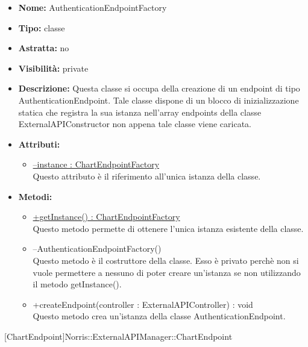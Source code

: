 			
			\begin{itemize}
			\item \textbf{Nome:} AuthenticationEndpointFactory
			\item \textbf{Tipo:} classe
			
		\item \textbf{Astratta:}
		no
			\item \textbf{Visibilità:} private
			\item \textbf{Descrizione:} Questa classe si occupa della creazione di un endpoint di tipo AuthenticationEndpoint. Tale classe dispone di un blocco di inizializzazione statica che registra la sua istanza nell'array endpoints della classe ExternalAPIConstructor non appena tale classe viene caricata.
			\item \textbf{Attributi:}
				\begin{itemize}
				\setlength{\itemsep}{5pt}
				
					\item[\ding{111}] \underline{--instance : ChartEndpointFactory} \\ [1mm] Questo attributo è il riferimento all'unica istanza della classe.
				\end{itemize}
		
			\item \textbf{Metodi:}
				\begin{itemize}
				\setlength{\itemsep}{5pt}
				
					\item[\ding{111}] {\underline{+getInstance() : ChartEndpointFactory}} \\ [1mm] Questo metodo permette di ottenere l'unica istanza esistente della classe.
					\item[\ding{111}] {{--AuthenticationEndpointFactory()}} \\ [1mm] Questo metodo è il costruttore della classe. Esso è privato perchè non si vuole permettere a nessuno di poter creare un’istanza se non utilizzando il metodo getInstance().

					\item[\ding{111}] {{+createEndpoint(controller : ExternalAPIController) : void}} \\ [1mm] Questo metodo crea un'istanza della classe AuthenticationEndpoint.
				\end{itemize}
		
			\end{itemize}

			
			[ChartEndpoint]{Norris::ExternalAPIManager::ChartEndpoint}
			

